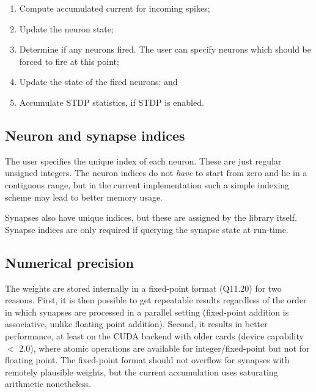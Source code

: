 \documentclass[a4paper]{article}
\begin{document}
\begin{enumerate}

	\item Compute accumulated current for incoming spikes;

	\item Update the neuron state;

  \item Determine if any neurons fired. The user can specify neurons which
  should be forced to fire at this point;

	\item Update the state of the fired neurons; and

  \item Accumulate STDP statistics, if STDP is enabled.

\end{enumerate}

\subsection{Neuron and synapse indices}

The user specifies the unique index of each neuron. These are just regular
unsigned integers. The neuron indices do not \emph{have} to start from zero and
lie in a contiguous range, but in the current implementation such a simple
indexing scheme may lead to better memory usage.

Synapses also have unique indices, but these are assigned by the library itself.
Synapse indices are only required if querying the synapse state at run-time.


\subsection{Numerical precision}

The weights are stored internally in a fixed-point format (Q11.20) for two
reasons.  First, it is then possible to get repeatable results regardless of
the order in which synapses are processed in a parallel setting (fixed-point
addition is associative, unlike floating point addition).  Second, it results
in better performance, at least on the CUDA backend with older cards (device
capability $<$ 2.0), where atomic operations are available for
integer/fixed-point but not for floating point.  The fixed-point format should
not overflow for synapses with remotely plausible weights, but the current
accumulation uses saturating arithmetic nonetheless.
\end{document}

